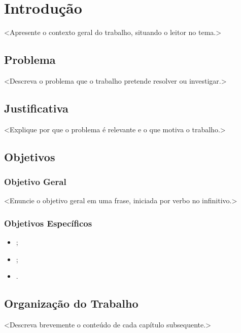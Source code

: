 \chapter[Introdução]{Introdução}\label{ch:introducao}

<Apresente o contexto geral do trabalho, situando o leitor no tema.>

\section{Problema}\label{sec:problema}

<Descreva o problema que o trabalho pretende resolver ou investigar.>

\section{Justificativa}\label{sec:justificativa}

<Explique por que o problema é relevante e o que motiva o trabalho.>

\section{Objetivos}\label{sec:objetivos}

\subsection{Objetivo Geral}\label{subsec:objetivo_geral}

<Enuncie o objetivo geral em uma frase, iniciada por verbo no infinitivo.>

\subsection{Objetivos Específicos}\label{subsec:objetivos_especificos}

\begin{itemize}
    \item <Objetivo específico 1>;
    \item <Objetivo específico 2>;
    \item <Objetivo específico 3>.
\end{itemize}

%

\section{Organização do Trabalho}\label{sec:organizacao}

<Descreva brevemente o conteúdo de cada capítulo subsequente.>
